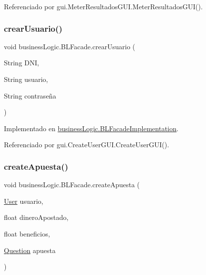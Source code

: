 Referenciado por gui.\+Meter\+Resultados\+G\+U\+I.\+Meter\+Resultados\+G\+U\+I().

\mbox{\label{interfacebusinessLogic_1_1BLFacade_ad5ddf0ebb395d8d4d8574ccb9cc4047e}} 
\subsubsection{\texorpdfstring{crearUsuario()}{crearUsuario()}}
{\footnotesize\ttfamily void business\+Logic.\+B\+L\+Facade.\+crear\+Usuario (\begin{DoxyParamCaption}\item[{String}]{D\+NI,  }\item[{String}]{usuario,  }\item[{String}]{contraseña }\end{DoxyParamCaption})}



Implementado en \mbox{\hyperlink{classbusinessLogic_1_1BLFacadeImplementation_a2127be166dc2d3c992f3435006ab0575}{business\+Logic.\+B\+L\+Facade\+Implementation}}.



Referenciado por gui.\+Create\+User\+G\+U\+I.\+Create\+User\+G\+U\+I().

\mbox{\label{interfacebusinessLogic_1_1BLFacade_a9656d5e373e849021e3b77ee4bb2ad65}} 
\subsubsection{\texorpdfstring{createApuesta()}{createApuesta()}}
{\footnotesize\ttfamily void business\+Logic.\+B\+L\+Facade.\+create\+Apuesta (\begin{DoxyParamCaption}\item[{\mbox{\hyperlink{classdomain_1_1User}{User}}}]{usuario,  }\item[{float}]{dinero\+Apostado,  }\item[{float}]{beneficios,  }\item[{\mbox{\hyperlink{classdomain_1_1Question}{Question}}}]{apuesta }\end{DoxyParamCaption})}



